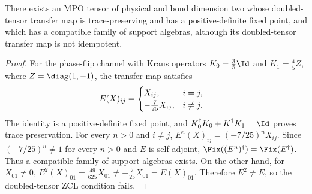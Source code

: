 \begin{lemma}%
    \label{thm:mpdo_algebra_tower_not_imply_zcl}
    \leanok
    There exists an MPO tensor of physical and bond dimension two whose
    doubled-tensor transfer map is trace-preserving and has a
    positive-definite fixed point, and which has a compatible family of
    support algebras, although its doubled-tensor transfer map is not
    idempotent.
\end{lemma}
\begin{proof}\leanok
    For the phase-flip channel with Kraus operators
    $K_0=\frac35 \Id$ and $K_1=\frac45 Z$, where $Z=\diag(1,-1)$,
    the transfer map satisfies
    \begin{align}
        E(X)_{ij}
         & =
        \begin{cases}
            X_{ij},            & i=j,     \\
            -\frac7{25}X_{ij}, & i\neq j.
        \end{cases}
        \notag
    \end{align}
    The identity is a positive-definite fixed point, and
    $K_0^\dagger K_0+K_1^\dagger K_1=\Id$ proves trace preservation.
    For every $n>0$ and $i\neq j$,
    $E^n(X)_{ij}=(-7/25)^n X_{ij}$. Since $(-7/25)^n\neq 1$ for every $n>0$
    and $E$ is self-adjoint,
    $\Fix((E^n)^\dagger)=\Fix(E^\dagger)$. Thus a compatible family of support
    algebras exists. On the other hand, for $X_{01}\ne0$,
    $E^2(X)_{01}=\frac{49}{625}X_{01}\neq-\frac7{25}X_{01}=E(X)_{01}$.
    Therefore $E^2\neq E$, so the doubled-tensor ZCL condition fails.
\end{proof}

